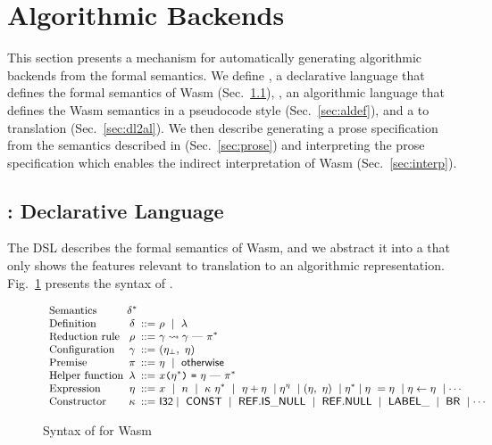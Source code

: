 \section{Algorithmic Backends}\label{sec:al}
This section presents a mechanism for automatically generating
algorithmic backends from the formal semantics.
We define \emph{\dl}, a declarative language that defines the formal
semantics of Wasm (Sec.~\ref{sec:dl}),
\emph{\al}, an algorithmic language that defines the Wasm semantics
in a pseudocode style (Sec.~\ref{sec:aldef}),
and a \dl to \al translation (Sec.~\ref{sec:dl2al}).
We then describe generating a prose specification from the semantics
described in \al (Sec.~\ref{sec:prose}) and interpreting the prose
specification which enables the indirect interpretation of Wasm (Sec.~\ref{sec:interp}).

\subsection{\dl: Declarative Language}\label{sec:dl}
The DSL describes the formal semantics of Wasm, and
we abstract it into a \dl that only shows the features relevant to translation to an algorithmic representation.
Fig.~\ref{fig:dl-syntax} presents the syntax of \dl.

\begin{figure}[t]
\[
\small
\begin{array}{l@{~}c@{~}r@{~}l}
\text{Semantics} & \delta^*\\
\text{Definition} & \delta &::=& \rho\ \mid\ \lambda\\
\text{Reduction rule} & \rho &::=& \gamma \leadsto \gamma\ \mbox{---}\ \pi^*\\
\text{Configuration} & \gamma &::=&(\eta_\bot,\ \eta)\\
\text{Premise} & \pi &::=& \eta\ \mid\ \mathsf{\small otherwise}\\
\text{Helper function} &
\lambda &::=& \varx \kwrl \eta^* \kwrr\ \kwequ\ \eta\ \mbox{---}\ \pi^*\\
\text{Expression} & \eta &::=&
x\ \mid\ n\
\mid\ \kappa\ \eta^*\ \mid\ \eta + \eta\
\mid \eta^\eta\ \mid (\eta,\ \eta)\ \mid \eta^*
\mid \eta\ = \eta\ \mid \eta \leftarrow \eta\
\mid \cdots \\
\text{Constructor} & \kappa &::=&
\ssf{I32} \mid\ \ssf{CONST}\ \mid\ \ssf{REF.IS\_NULL}\ \mid\ \ssf{REF.NULL}\
\mid\ \ssf{LABEL\_}\
\mid\ \ssf{BR}\
\mid \cdots
\end{array}
\]
\caption{Syntax of \dl for Wasm}\label{fig:dl-syntax}
\end{figure}

